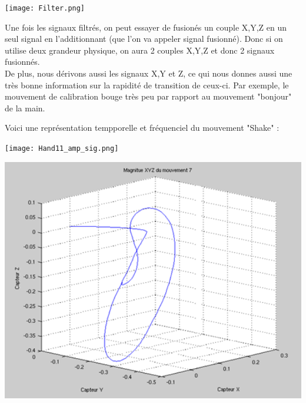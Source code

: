 \begin{center} 
\hspace{15cm}
\texttt{[image: Filter.png]}
\end{center}
\vspace{0.5cm} 

Une fois les signaux filtrés, on peut essayer de fusionés un couple X,Y,Z en un seul signal en l'additionnant (que l'on va appeler signal fusionné). Donc si on utilise deux grandeur physique, on aura 2 couples X,Y,Z et donc 2 signaux fusionnés. \\

De plus, nous dérivons aussi les signaux X,Y et Z, ce qui nous donnes aussi une très bonne information sur la rapidité de transition de ceux-ci. Par exemple, le mouvement de calibration bouge très peu par rapport au mouvement "bonjour" de la main. 

\pagebreak 
Voici une représentation tempporelle et fréquenciel du mouvement "Shake" :

\begin{center} 
\hspace{15cm}
\texttt{[image: Hand11\_amp\_sig.png]}
\end{center}
\vspace{0.5cm} 

\begin{center} 
\hspace{15cm}
\includegraphics[width=15cm]{Ressources/Graphiques/MFB/Quaternions3D.png}
\end{center}
\vspace{0.5cm} 

